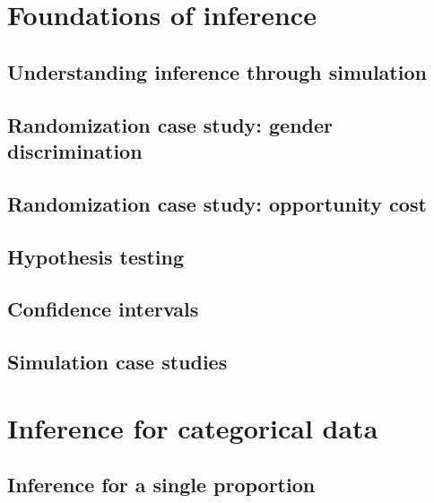 \documentclass[]{book}
\begin{document}
\hypertarget{inference-foundations}{%
\chapter{Foundations of inference}\label{inference-foundations}}

\hypertarget{understanding-inference-through-simulation}{%
\section{Understanding inference through simulation}\label{understanding-inference-through-simulation}}

\hypertarget{randomization-case-study-gender-discrimination}{%
\section{Randomization case study: gender discrimination}\label{randomization-case-study-gender-discrimination}}

\hypertarget{randomization-case-study-opportunity-cost}{%
\section{Randomization case study: opportunity cost}\label{randomization-case-study-opportunity-cost}}

\hypertarget{hypothesis-testing}{%
\section{Hypothesis testing}\label{hypothesis-testing}}

\hypertarget{confidence-intervals}{%
\section{Confidence intervals}\label{confidence-intervals}}

\hypertarget{simulation-case-studies}{%
\section{Simulation case studies}\label{simulation-case-studies}}

\hypertarget{inference-cat}{%
\chapter{Inference for categorical data}\label{inference-cat}}

\hypertarget{inference-for-a-single-proportion}{%
\section{Inference for a single proportion}\label{inference-for-a-single-proportion}}
\end{document}
